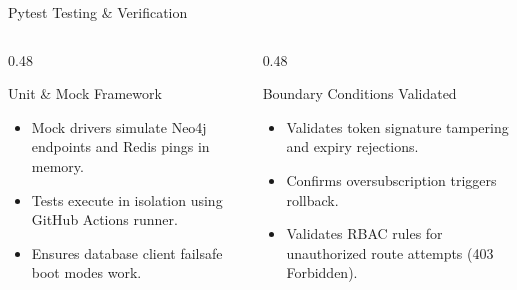 \documentclass[aspectratio=169, 10pt]{beamer}
\begin{document}
\begin{frame}{Pytest Testing \& Verification}
  \begin{columns}[T]
    \begin{column}{0.48\textwidth}
      \begin{scard}{Unit \& Mock Framework}
        \begin{itemize}
          \item Mock drivers simulate Neo4j endpoints and Redis pings in memory.
          \item Tests execute in isolation using GitHub Actions runner.
          \item Ensures database client failsafe boot modes work.
        \end{itemize}
      \end{scard}
    \end{column}
    \begin{column}{0.48\textwidth}
      \begin{scard}{Boundary Conditions Validated}
        \begin{itemize}
          \item Validates token signature tampering and expiry rejections.
          \item Confirms oversubscription triggers rollback.
          \item Validates RBAC rules for unauthorized route attempts (403 Forbidden).
        \end{itemize}
      \end{scard}
    \end{column}
  \end{columns}
\end{frame}
\end{document}
